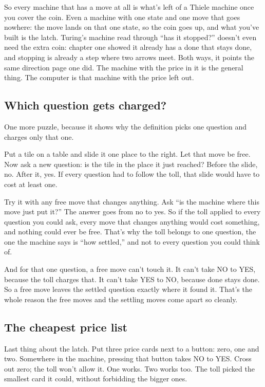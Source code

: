 \documentclass[11pt,twoside]{article}
\theoremstyle{thielethm}
\theoremstyle{thieledef}
\theoremstyle{thieledef}
\theoremstyle{thieledef}
\theoremstyle{thielethm}
\theoremstyle{thieleobs}
\theoremstyle{thielethm}
\begin{document}
So every machine that has a move at all is what's left of a Thiele machine once you cover the coin. Even a machine with one state and one move that goes nowhere: the move lands on that one state, so the coin goes up, and what you've built is the latch. Turing's machine read through ``has it stopped?'' doesn't even need the extra coin: chapter one showed it already has a done that stays done, and stopping is already a step where two arrows meet. Both ways, it points the same direction page one did. The machine with the price in it is the general thing. The computer is that machine with the price left out.

\subsection{Which question gets charged?}

One more puzzle, because it shows why the definition picks one question and charges only that one.

Put a tile on a table and slide it one place to the right. Let that move be free. Now ask a new question: is the tile in the place it just reached? Before the slide, no. After it, yes. If every question had to follow the toll, that slide would have to cost at least one.

Try it with any free move that changes anything. Ask ``is the machine where this move just put it?'' The answer goes from no to yes. So if the toll applied to every question you could ask, every move that changes anything would cost something, and nothing could ever be free. That's why the toll belongs to one question, the one the machine says is ``how settled,'' and not to every question you could think of.

And for that one question, a free move can't touch it. It can't take NO to YES, because the toll charges that. It can't take YES to NO, because done stays done. So a free move leaves the settled question exactly where it found it. That's the whole reason the free moves and the settling moves come apart so cleanly.

\subsection{The cheapest price list}

Last thing about the latch. Put three price cards next to a button: zero, one and two. Somewhere in the machine, pressing that button takes NO to YES. Cross out zero; the toll won't allow it. One works. Two works too. The toll picked the smallest card it could, without forbidding the bigger ones.
\end{document}
